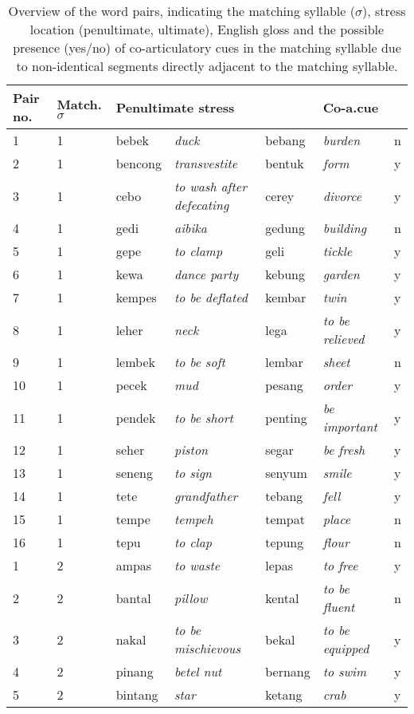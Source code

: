 \begin{table} 
\caption{Overview of the word pairs, indicating the matching syllable ($\sigma$), stress location (penultimate, ultimate), English gloss and the possible presence (yes/no) of co-articulatory cues in the matching syllable due to non-identical segments directly adjacent to the matching syllable.}
\label{app73}
\scriptsize
\begin{tabularx}{\textwidth}{p{0.9cm}p{0.9cm}p{1cm}>{\itshape}p{2.7cm}p{1cm}>{\itshape}p{1.7cm}p{1.1cm}} 
\lsptoprule
 Pair no. & Match.$\sigma$ & \multicolumn{2}{l}{Penultimate stress} & \multicolumn{2}{l}{Ultimate stress} & Co-a.cue\\
 \midrule
1 & 1 & bebek & duck & bebang & burden & n\\
2 & 1 & bencong & transvestite & bentuk & form & y\\
3 & 1 & cebo & to wash after defecating & cerey & divorce & y\\
4 & 1 & gedi & aibika & gedung & building & n\\
5 & 1 & gepe & to clamp & geli & tickle & y\\
6 & 1 & kewa & dance party & kebung & garden & y\\
7 & 1 & kempes & to be deflated & kembar & twin & y\\
8 & 1 & leher & neck & lega & to be relieved & y\\
9 & 1 & lembek & to be soft & lembar & sheet & n\\
10 & 1 & pecek & mud & pesang & order & y\\
11 & 1 & pendek & to be short & penting & be important & y\\
12 & 1 & seher & piston & segar & be fresh & y\\
13 & 1 & seneng & to sign & senyum & smile & y\\
14 & 1 & tete & grandfather & tebang & fell & y\\
15 & 1 & tempe & tempeh & tempat & place & n\\
16 & 1 & tepu & to clap & tepung & flour & n\\
\midrule
1 & 2 & ampas & to waste & lepas & to free & y\\
2 & 2 & bantal & pillow & kental & to be fluent & n\\
3 & 2 & nakal & to be mischievous & bekal & to be equipped & y\\
4 & 2 & pinang & betel nut & bernang & to swim & y\\
5 & 2 & bintang & star & ketang & crab & y\\

\end{tabularx}
\end{table}
